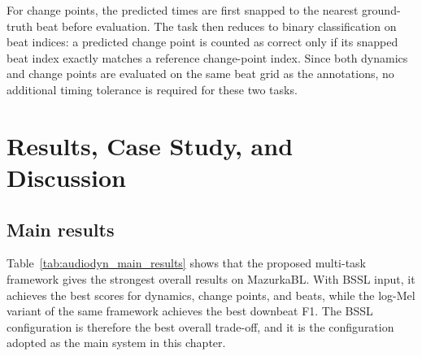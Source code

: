 For change points, the predicted times are first snapped to the nearest ground-truth beat before evaluation. The task then reduces to binary classification on beat indices: a predicted change point is counted as correct only if its snapped beat index exactly matches a reference change-point index. Since both dynamics and change points are evaluated on the same beat grid as the annotations, no additional timing tolerance is required for these two tasks.

\section{Results, Case Study, and Discussion}
\label{sec:audiodyn_results}

\subsection{Main results}
\label{ssec:audiodyn_mainres}

Table~\ref{tab:audiodyn_main_results} shows that the proposed multi-task framework gives the strongest overall results on MazurkaBL. With BSSL input, it achieves the best scores for dynamics, change points, and beats, while the log-Mel variant of the same framework achieves the best downbeat F1. The BSSL configuration is therefore the best overall trade-off, and it is the configuration adopted as the main system in this chapter.

